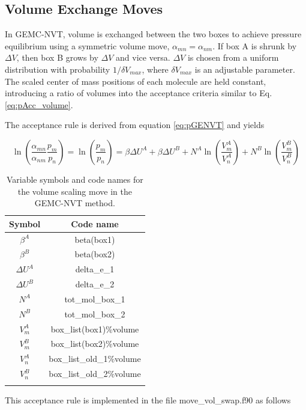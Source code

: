 \subsection{Volume Exchange Moves} 
\label{sec:vol_swap}

In GEMC-NVT, volume is exchanged between the two boxes to achieve pressure equilibrium using a symmetric volume move, $\alpha_{mn} = \alpha_{nm}$.
If box A is shrunk by $\Delta V$, then box B grows by $\Delta V$ and vice versa.
$\Delta V$ is chosen from a uniform distribution with probability $1/\delta V_{max}$, 
where $\delta V_{max}$ is an adjustable parameter.
The scaled center of mass positions of each molecule are held constant, 
introducing a ratio of volumes into the acceptance criteria similar to Eq. \ref{eq:pAcc_volume}.

The acceptance rule is derived from equation \ref{eq:pGENVT} and yields

\begin{equation}
\ln \left( \frac{\alpha_{mn}}{\alpha_{nm}} \frac{p_m}{p_n} \right) = \ln \left( \frac{p_m}{p_n} \right) = \beta \Delta U^A + \beta \Delta U^B + N^A \ln\left(\frac{V^A_m}{V^A_n}\right) + N^B \ln\left(\frac{V^B_m}{V^B_n}\right)
\label{eq:pAcc_vol_swap}
\end{equation}

\begin{table}
\caption{Variable symbols and code names for the volume scaling move in the GEMC-NVT method.}
\label{table:gemc_nvt_volume}
\centering
\begin{tabular}{|c|c|} \hline
 {\bf Symbol} & {\bf Code name} \\ \hline
 $\beta^A$ & beta(box1) \\
 $\beta^B$ & beta(box2) \\
 $\Delta U^A$ & delta\_e\_1 \\
 $\Delta U^B$ & delta\_e\_2 \\
 $N^A$ & tot\_mol\_box\_1 \\
 $N^B$ & tot\_mol\_box\_2 \\
 $V^A_m$ & box\_list(box1)\%volume \\
 $V^B_m$ & box\_list(box2)\%volume \\
 $V^A_n$ & box\_list\_old\_1\%volume \\
 $V^B_n$ & box\_list\_old\_2\%volume \\
 \hline
\multicolumn{2}{c}{}
\end{tabular}
\end{table}

This acceptance rule is implemented in the file move\_vol\_swap.f90 as follows

